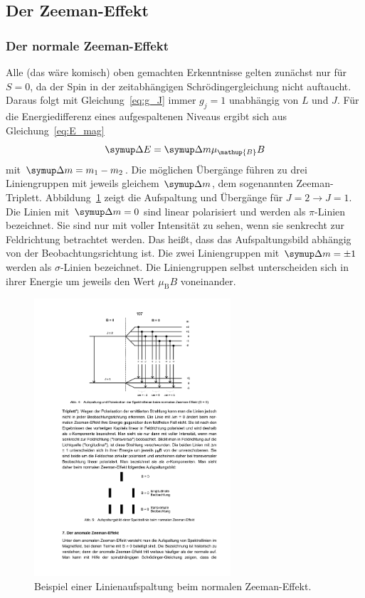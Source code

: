 \subsection{Der Zeeman-Effekt}
%
\subsubsection{Der normale Zeeman-Effekt}
%
Alle (das wäre komisch) oben gemachten Erkenntnisse gelten zunächst nur für $S=0$, da der Spin in der zeitabhängigen Schrödingergleichung nicht auftaucht.
Daraus folgt mit Gleichung~\eqref{eq:g_J} immer $g_j=1$ unabhängig von $L$ und $J$.
Für die Energiedifferenz eines aufgespaltenen Niveaus ergibt sich aus Gleichung~\eqref{eq:E_mag}
%
\begin{equation}
    \upD E=\upD m\mu_{\mathup{B}}B
    \label{eq:dE_norm}
\end{equation}
%
mit $\upD m=m_1-m_2$. Die möglichen Übergänge führen zu drei Liniengruppen mit jeweils gleichem $\upD m$, dem sogenannten Zeeman-Triplett.
Abbildung~\ref{fig:zeeman_normal} zeigt die Aufspaltung und Übergänge für $J=2\rightarrow J=1$.
Die Linien mit $\upD m=0$ sind linear polarisiert und werden als $\pi$-Linien bezeichnet.
Sie sind nur mit voller Intensität zu sehen, wenn sie senkrecht zur Feldrichtung betrachtet werden.
Das heißt, dass das Aufspaltungsbild abhängig von der Beobachtungsrichtung ist.
Die zwei Liniengruppen mit $\upD m=\pm1$ werden als $\sigma$-Linien bezeichnet.
Die Liniengruppen selbst unterscheiden sich in ihrer Energie um jeweils den Wert $\mu_{\mathup{B}}B$ voneinander.
%
\begin{figure}
    \centering
    \includegraphics[width=0.65\textwidth]{figure/zeeman_normal.pdf}
    \caption{Beispiel einer Linienaufspaltung beim normalen Zeeman-Effekt.\cite{V27}}
    \label{fig:zeeman_normal}
\end{figure}
%
